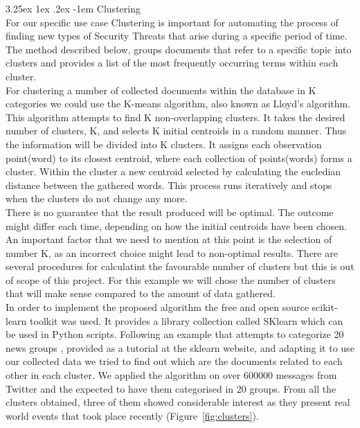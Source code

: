 \documentclass[12pt]{article}
\makeatletter
\renewcommand\paragraph{\@startsection{paragraph}{5}{\z@}%
  {3.25ex \@plus1ex \@minus.2ex}%
  {-1em}%
  {\normalfont\normalsize\bfseries}}
\makeatother
\begin{document}
\paragraph{Clustering}
\hfill \break 
\\
For our specific use case Clustering is important for automating the process of finding new types of Security Threats that arise during a specific period of time. 
\hfill \break 
\\
The method described below, groups documents that refer to a specific topic into clusters and provides a list of the most frequently occurring terms within each cluster.
\hfill \break 
\\
For clustering a number of collected documents within the database in K categories we could use the K-means\cite{k-means} algorithm, also known as Lloyd's algorithm. This algorithm \cite{k-means-example} attempts to find K non-overlapping clusters. It takes the desired number of clusters, K, and selects K initial centroids in a  random manner. Thus the information will be divided into K clusters. It assigns each observation point(word) to its closest centroid, where each collection of points(words) forms a cluster. Within the cluster a new centroid selected by calculating the eucledian distance between the gathered words. This process runs iteratively and stops when the clusters do not change any more.
\hfill \break 
\\ 
There is no guarantee that the result produced will be optimal. The outcome might differ each time, depending on how the initial centroids have been chosen. An important factor that we need to mention at this point is the selection of number K, as an incorrect choice might lead to non-optimal results. There are several procedures\cite{procedures-for-kmeans} for calculatint the favourable number of clusters but this is out of scope of this project. For this example we will chose the number of clusters that will make sense compared to the amount of data gathered.
\hfill \break 
\\
In order to implement the proposed algorithm the free and open source scikit-learn \cite{sklearn} toolkit was used. It provides a library collection called SKlearn which can be used in Python scripts. Following an example that attempts to categorize 20 news groups \cite{k-means-20news}, provided as a tutorial at the sklearn website, and adapting it to use our collected data we tried to find out which are the documents related to each other in each cluster. We applied the algorithm on over 600000 messages from Twitter and the expected to have them categorised in 20 groups. From all the clusters obtained, three of them showed considerable interest as they present real world events that took place recently (Figure~\ref{fig:clusters}). 
\end{document}
